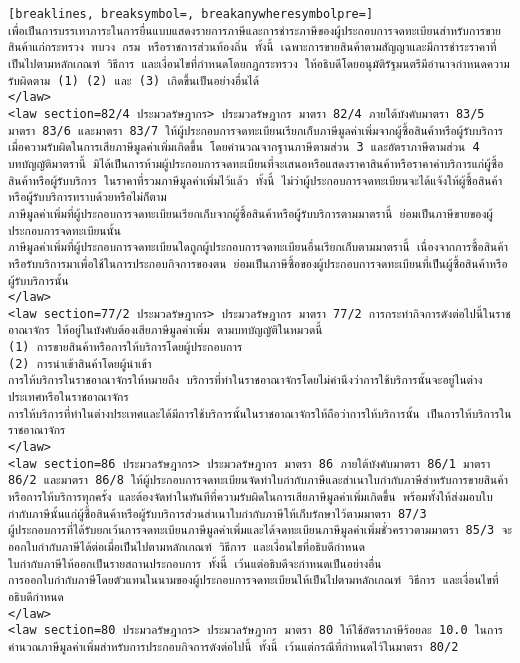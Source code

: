 \begin{Verbatim}[breaklines, breaksymbol=, breakanywheresymbolpre=]
เพื่อเป็นการบรรเทาภาระในการยื่นแบบแสดงรายการภาษีและการชำระภาษีของผู้ประกอบการจดทะเบียนสำหรับการขายสินค้าแก่กระทรวง ทบวง กรม หรือราชการส่วนท้องถิ่น ทั้งนี้ เฉพาะการขายสินค้าตามสัญญาและมีการชำระราคาที่เป็นไปตามหลักเกณฑ์ วิธีการ และเงื่อนไขที่กำหนดโดยกฎกระทรวง ให้อธิบดีโดยอนุมัติรัฐมนตรีมีอำนาจกำหนดความรับผิดตาม (1) (2) และ (3) เกิดขึ้นเป็นอย่างอื่นได้
</law>
<law section=82/4 ประมวลรัษฎากร> ประมวลรัษฎากร มาตรา 82/4 ภายใต้บังคับมาตรา 83/5 มาตรา 83/6 และมาตรา 83/7 ให้ผู้ประกอบการจดทะเบียนเรียกเก็บภาษีมูลค่าเพิ่มจากผู้ซื้อสินค้าหรือผู้รับบริการเมื่อความรับผิดในการเสียภาษีมูลค่าเพิ่มเกิดขึ้น โดยคำนวณจากฐานภาษีตามส่วน 3 และอัตราภาษีตามส่วน 4
บทบัญญัติมาตรานี้ มิได้เป็นการห้ามผู้ประกอบการจดทะเบียนที่จะเสนอหรือแสดงราคาสินค้าหรือราคาค่าบริการแก่ผู้ซื้อสินค้าหรือผู้รับบริการ ในราคาที่รวมภาษีมูลค่าเพิ่มไว้แล้ว ทั้งนี้ ไม่ว่าผู้ประกอบการจดทะเบียนจะได้แจ้งให้ผู้ซื้อสินค้าหรือผู้รับบริการทราบด้วยหรือไม่ก็ตาม
ภาษีมูลค่าเพิ่มที่ผู้ประกอบการจดทะเบียนเรียกเก็บจากผู้ซื้อสินค้าหรือผู้รับบริการตามมาตรานี้ ย่อมเป็นภาษีขายของผู้ประกอบการจดทะเบียนนั้น
ภาษีมูลค่าเพิ่มที่ผู้ประกอบการจดทะเบียนใดถูกผู้ประกอบการจดทะเบียนอื่นเรียกเก็บตามมาตรานี้ เนื่องจากการซื้อสินค้าหรือรับบริการมาเพื่อใช้ในการประกอบกิจการของตน ย่อมเป็นภาษีซื้อของผู้ประกอบการจดทะเบียนที่เป็นผู้ซื้อสินค้าหรือผู้รับบริการนั้น
</law>
<law section=77/2 ประมวลรัษฎากร> ประมวลรัษฎากร มาตรา 77/2 การกระทำกิจการดังต่อไปนี้ในราชอาณาจักร ให้อยู่ในบังคับต้องเสียภาษีมูลค่าเพิ่ม ตามบทบัญญัติในหมวดนี้
(1) การขายสินค้าหรือการให้บริการโดยผู้ประกอบการ
(2) การนำเข้าสินค้าโดยผู้นำเข้า
การให้บริการในราชอาณาจักรให้หมายถึง บริการที่ทำในราชอาณาจักรโดยไม่คำนึงว่าการใช้บริการนั้นจะอยู่ในต่างประเทศหรือในราชอาณาจักร
การให้บริการที่ทำในต่างประเทศและได้มีการใช้บริการนั้นในราชอาณาจักรให้ถือว่าการให้บริการนั้น เป็นการให้บริการในราชอาณาจักร
</law>
<law section=86 ประมวลรัษฎากร> ประมวลรัษฎากร มาตรา 86 ภายใต้บังคับมาตรา 86/1 มาตรา 86/2 และมาตรา 86/8 ให้ผู้ประกอบการจดทะเบียนจัดทำใบกำกับภาษีและสำเนาใบกำกับภาษีสำหรับการขายสินค้า หรือการให้บริการทุกครั้ง และต้องจัดทำในทันทีที่ความรับผิดในการเสียภาษีมูลค่าเพิ่มเกิดขึ้น พร้อมทั้งให้ส่งมอบใบกำกับภาษีนั้นแก่ผู้ซื้อสินค้าหรือผู้รับบริการส่วนสำเนาใบกำกับภาษีให้เก็บรักษาไว้ตามมาตรา 87/3
ผู้ประกอบการที่ได้รับยกเว้นการจดทะเบียนภาษีมูลค่าเพิ่มและได้จดทะเบียนภาษีมูลค่าเพิ่มชั่วคราวตามมาตรา 85/3 จะออกใบกำกับภาษีได้ต่อเมื่อเป็นไปตามหลักเกณฑ์ วิธีการ และเงื่อนไขที่อธิบดีกำหนด
ใบกำกับภาษีให้ออกเป็นรายสถานประกอบการ ทั้งนี้ เว้นแต่อธิบดีจะกำหนดเป็นอย่างอื่น
การออกใบกำกับภาษีโดยตัวแทนในนามของผู้ประกอบการจดทะเบียนให้เป็นไปตามหลักเกณฑ์ วิธีการ และเงื่อนไขที่อธิบดีกำหนด
</law>
<law section=80 ประมวลรัษฎากร> ประมวลรัษฎากร มาตรา 80 ให้ใช้อัตราภาษีร้อยละ 10.0 ในการคำนวณภาษีมูลค่าเพิ่มสำหรับการประกอบกิจการดังต่อไปนี้ ทั้งนี้ เว้นแต่กรณีที่กำหนดไว้ในมาตรา 80/2

\end{Verbatim}
